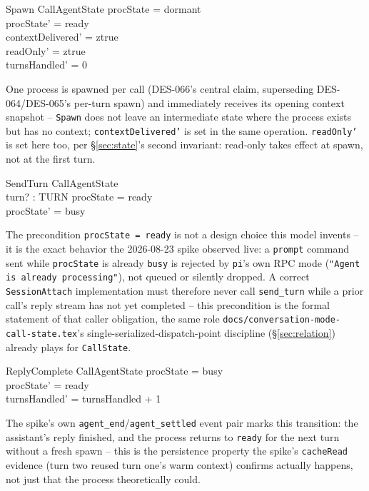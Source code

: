 \documentclass[a4paper,10pt,fleqn]{article}
\begin{document}
\begin{schema}{Spawn}
  \Delta CallAgentState
  \where
  procState = dormant \\
  procState' = ready \\
  contextDelivered' = ztrue \\
  readOnly' = ztrue \\
  turnsHandled' = 0
\end{schema}

One process is spawned per call (DES-066's central claim, superseding
DES-064/DES-065's per-turn spawn) and immediately receives its opening
context snapshot -- \texttt{Spawn} does not leave an intermediate state where
the process exists but has no context; \texttt{contextDelivered'} is set in
the same operation. \texttt{readOnly'} is set here too, per
\S\ref{sec:state}'s second invariant: read-only takes effect at spawn, not
at the first turn.

\begin{schema}{SendTurn}
  \Delta CallAgentState \\
  turn? : TURN
  \where
  procState = ready \\
  procState' = busy
\end{schema}

The precondition \texttt{procState = ready} is not a design choice this model
invents -- it is the exact behavior the 2026-08-23 spike observed live: a
\texttt{prompt} command sent while \texttt{procState} is already \texttt{busy}
is rejected by \texttt{pi}'s own RPC mode
(\texttt{"Agent is already processing"}), not queued or silently dropped. A
correct \texttt{SessionAttach} implementation must therefore never call
\texttt{send\_turn} while a prior call's reply stream has not yet completed --
this precondition is the formal statement of that caller obligation, the same
role \texttt{docs/conversation-mode-call-state.tex}'s single-serialized-dispatch-point
discipline (\S\ref{sec:relation}) already plays for \texttt{CallState}.

\begin{schema}{ReplyComplete}
  \Delta CallAgentState
  \where
  procState = busy \\
  procState' = ready \\
  turnsHandled' = turnsHandled + 1
\end{schema}

The spike's own \texttt{agent\_end}/\texttt{agent\_settled} event pair marks
this transition: the assistant's reply finished, and the process returns to
\texttt{ready} for the next turn without a fresh spawn -- this is the
persistence property the spike's \texttt{cacheRead} evidence
(turn two reused turn one's warm context) confirms actually happens, not just
that the process theoretically could.
\end{document}

